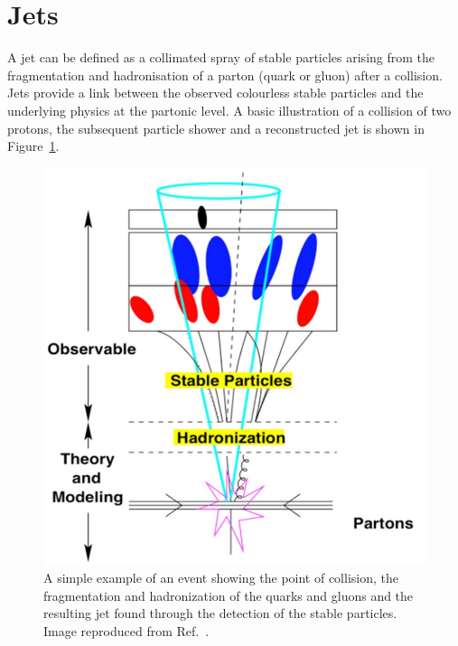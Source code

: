 \section{Jets}
\label{sec:jet} 
\large
A jet can be defined as a collimated spray 
of stable particles arising from the fragmentation
and hadronisation of a parton (quark or gluon) after a collision.
Jets provide a link between the observed colourless 
stable particles and the underlying physics at the partonic
level. A basic illustration of a collision of two protons,
the subsequent particle shower and a reconstructed jet is 
shown in Figure~\ref{fig:jets}.

\begin{figure}[bht]
    \begin{centering}	
    \includegraphics[width=.6\textwidth]{Reconstruction/plots/Jets.jpg}
    \caption{A simple example of an event showing the point of collision, 
    the fragmentation and hadronization of the quarks and gluons and the 
    resulting jet found through the detection of the stable particles. 
    Image reproduced from Ref.~\cite{atkin2015review}.
        }
    \label{fig:jets}
    \end{centering}
\end{figure}


